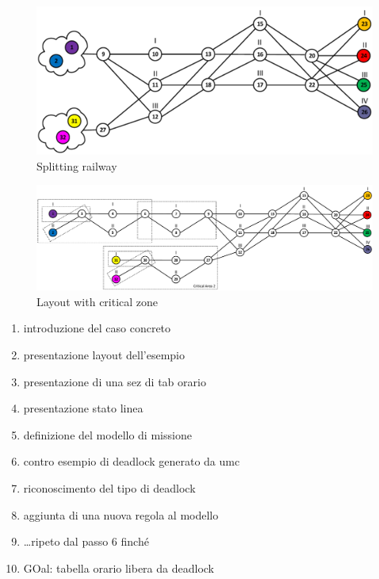 \documentclass{ewic}
\begin{document}
			
			\begin{figure}[htp]
				\begin{centering}	
				\includegraphics[scale=0.35]{img/esempioScomp3}
				\caption{Splitting railway}
				\label{fig:scomposizione3}
				\end{centering}
			\end{figure}
			
			\begin{figure}[htp]
				\begin{centering}	
				\includegraphics[scale=0.5]{img/esempiozone}
				\caption{Layout with critical zone}
				\label{fig:examplezone}
				\end{centering}
			\end{figure}
			
			
			\begin{enumerate}
			\item introduzione del caso concreto
			\item presentazione layout dell'esempio
			\item presentazione di una sez di tab orario
			\item presentazione stato linea
			\item definizione del modello di missione
			\item contro esempio di deadlock generato da umc
			\item riconoscimento del tipo di deadlock
			\item aggiunta di una nuova regola al modello
			\item \ldots ripeto dal passo 6 finch\'{e}
			\item GOal: tabella orario libera da deadlock
			\end{enumerate}
			
\end{document}
